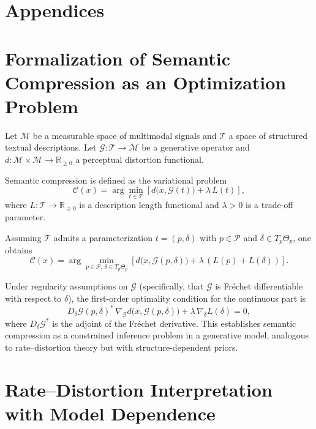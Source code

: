 \documentclass[11pt,a4paper]{article}
\theoremstyle{definition}
\theoremstyle{remark}
\begin{document}
\newpage
\section*{Appendices}
\appendix

\section{Formalization of Semantic Compression as an Optimization Problem}
\label{app:optimization}

Let $\mathcal{M}$ be a measurable space of multimodal signals and $\mathcal{T}$ a space of structured textual descriptions. Let $\mathcal{G} : \mathcal{T} \to \mathcal{M}$ be a generative operator and $d : \mathcal{M} \times \mathcal{M} \to \mathbb{R}_{\ge 0}$ a perceptual distortion functional.

Semantic compression is defined as the variational problem
\[
\mathcal{C}(x) = \arg\min_{t \in \mathcal{T}} \left[ d\big(x, \mathcal{G}(t)\big) + \lambda \, L(t) \right],
\]
where $L : \mathcal{T} \to \mathbb{R}_{\ge 0}$ is a description length functional and $\lambda > 0$ is a trade-off parameter.

Assuming $\mathcal{T}$ admits a parameterization $t = (p, \delta)$ with $p \in \mathcal{P}$ and $\delta \in T_p\Theta_p$, one obtains
\[
\mathcal{C}(x) = \arg\min_{p \in \mathcal{P}, \, \delta \in T_p\Theta_p} \left[ d\big(x, \mathcal{G}(p,\delta)\big) + \lambda \, (L(p) + L(\delta)) \right].
\]

Under regularity assumptions on $\mathcal{G}$ (specifically, that $\mathcal{G}$ is Fr\'{e}chet differentiable with respect to $\delta$), the first-order optimality condition for the continuous part is
\[
D_\delta \mathcal{G}(p, \delta)^* \, \nabla_{\mathcal{G}} d\big(x, \mathcal{G}(p,\delta)\big) + \lambda \, \nabla_\delta L(\delta) = 0,
\]
where $D_\delta \mathcal{G}^*$ is the adjoint of the Fr\'{e}chet derivative. This establishes semantic compression as a constrained inference problem in a generative model, analogous to rate--distortion theory but with structure-dependent priors.

\section{Rate--Distortion Interpretation with Model Dependence}
\label{app:ratedistortion}
\end{document}
